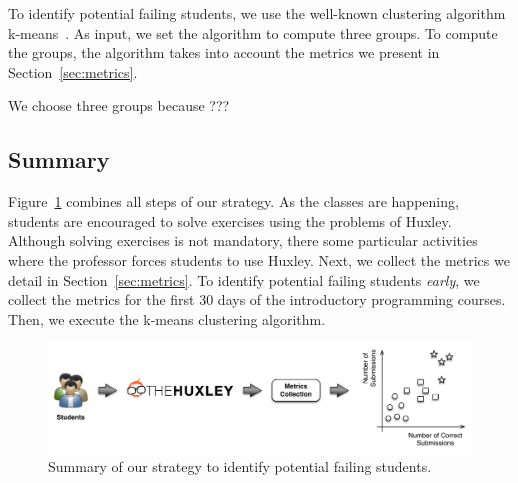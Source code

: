 To identify potential failing students, we use the well-known clustering algorithm k-means~\cite{}. As input, we set the algorithm to compute three groups. To compute the groups, the algorithm takes into account the metrics we present in Section~\ref{sec:metrics}.

We choose three groups because ???



\subsection{Summary}

Figure~\ref{fig:strategy} combines all steps of our strategy. As the classes are happening, students are encouraged to solve exercises using the problems of Huxley. Although solving exercises is not mandatory, there some particular activities where the professor forces students to use Huxley. Next, we collect the metrics we detail in Section~\ref{sec:metrics}. To identify potential failing students \textit{early}, we collect the metrics for the first 30 days of the introductory programming courses. Then, we execute the k-means clustering algorithm.


\begin{figure}[htb]
\centering
\includegraphics[width=1.0\textwidth,natwidth=610,natheight=642]{images/Strategy.pdf}
\caption{Summary of our strategy to identify potential failing students.}
\label{fig:strategy}
\end{figure}